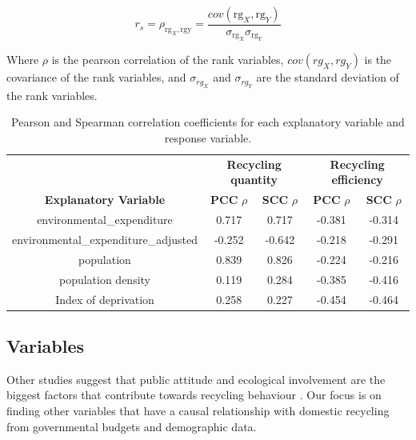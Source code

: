 \documentclass[11pt,conference]{IEEEtran}
\begin{document}
\begin{equation}
r _ { s } = \rho _ { \mathrm { rg } _ { X } , \mathrm { rgy } } = \frac { cov  \left( \mathrm { rg } _ { X } , \mathrm { rg } _ { Y } \right) } { \sigma _ { \mathrm { rg } _ { X } } \sigma _ { \mathrm { rg } _ { Y } } }
\label{equation:scc}
\end{equation}

Where $\rho$ is the pearson correlation of the rank variables, $cov(rg_{X}, rg_{Y})$ is the covariance of the rank variables, and $\sigma_{rg_{X}}$ and $\sigma_{rg_{Y}}$ are the standard deviation of the rank variables.

\begin{table}[!ht]
\centering
\caption{Pearson and Spearman correlation coefficients for each explanatory variable and response variable.}
\begin{tabular}{@{\extracolsep{4pt}}ccccc}
\toprule
& \multicolumn{2}{c}{\textbf{Recycling quantity}} & \multicolumn{2}{c}{\textbf{Recycling efficiency}}\\
\cmidrule(lr){2-3} \cmidrule(lr){4-5}
\textbf{Explanatory Variable}       	& \textbf{PCC} $\rho$ & \textbf{SCC} $\rho$ & \textbf{PCC} $\rho$ & \textbf{SCC} $\rho$   \\
\midrule
environmental\_expenditure         			 & 0.717           	& 0.717 & -0.381           	& -0.314              	\\
environmental\_expenditure\_adjusted   	 & -0.252          	& -0.642  & -0.218          	& -0.291             	\\
population                          	& 0.839           	& 0.826     	& -0.224           	& -0.216      	\\
population density                  	& 0.119           	& 0.284 	& -0.385           	& -0.416        	\\
Index of deprivation                	& 0.258           	& 0.227	& -0.454           	& -0.464         	\\
\bottomrule
\end{tabular}
\label{table:quantity}
\end{table}
\subsection{Variables}
Other studies suggest that public attitude and ecological involvement are the biggest factors that contribute towards recycling behaviour \cite{Valle2005, nishio_chizuru_takeuchi_toshie_1970}. Our focus is on finding other variables that have a causal relationship with domestic recycling from governmental budgets and demographic data.
\end{document}
